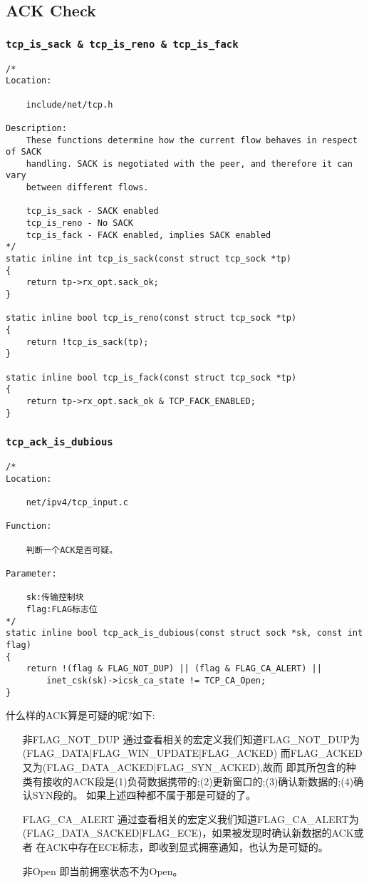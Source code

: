 	\subsection{ACK Check}
		\subsubsection{\texttt{tcp_is_sack & tcp_is_reno & tcp_is_fack}}
\begin{verbatim}
/* 
Location:

    include/net/tcp.h

Description:
    These functions determine how the current flow behaves in respect of SACK
    handling. SACK is negotiated with the peer, and therefore it can vary
    between different flows.

    tcp_is_sack - SACK enabled
    tcp_is_reno - No SACK
    tcp_is_fack - FACK enabled, implies SACK enabled
*/
static inline int tcp_is_sack(const struct tcp_sock *tp)
{
    return tp->rx_opt.sack_ok;
}

static inline bool tcp_is_reno(const struct tcp_sock *tp)
{
    return !tcp_is_sack(tp);
}

static inline bool tcp_is_fack(const struct tcp_sock *tp)
{
    return tp->rx_opt.sack_ok & TCP_FACK_ENABLED;
}
\end{verbatim}
        \subsubsection{\texttt{tcp_ack_is_dubious}}
			\label{ACKCheck:tcp_ack_is_dubious}
\begin{verbatim}
/*
Location:

    net/ipv4/tcp_input.c

Function:

    判断一个ACK是否可疑。

Parameter:

    sk:传输控制块
    flag:FLAG标志位
*/
static inline bool tcp_ack_is_dubious(const struct sock *sk, const int flag)
{
    return !(flag & FLAG_NOT_DUP) || (flag & FLAG_CA_ALERT) ||
        inet_csk(sk)->icsk_ca_state != TCP_CA_Open;
}
\end{verbatim}

    什么样的ACK算是可疑的呢?如下:
\begin{enumerate}
\item[非FLAG\_NOT\_DUP] 通过查看相关的宏定义我们知道FLAG\_NOT\_DUP为(FLAG\_DATA|FLAG\_WIN\_UPDATE|FLAG\_ACKED)
                        而FLAG\_ACKED又为(FLAG\_DATA\_ACKED|FLAG\_SYN\_ACKED),故而
                        即其所包含的种类有接收的ACK段是(1)负荷数据携带的;(2)更新窗口的;(3)确认新数据的;(4)确认SYN段的。
                        如果上述四种都不属于那是可疑的了。
            
\item[FLAG\_CA\_ALERT]  通过查看相关的宏定义我们知道FLAG\_CA\_ALERT为(FLAG\_DATA\_SACKED|FLAG\_ECE)，如果被发现时确认新数据的ACK或者
                        在ACK中存在ECE标志，即收到显式拥塞通知，也认为是可疑的。\color{red}{似乎和上面的有矛盾，}
\item[非Open]           即当前拥塞状态不为Open。
\end{enumerate}

